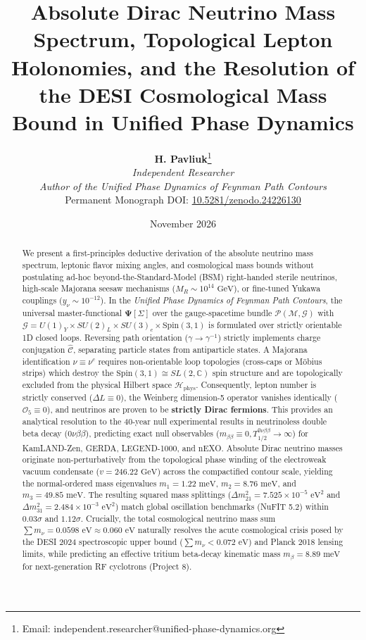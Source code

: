 \documentclass[11pt,a4paper]{article}
\title{\textbf{\LARGE Absolute Dirac Neutrino Mass Spectrum, Topological Lepton Holonomies, and the Resolution of the DESI Cosmological Mass Bound in Unified Phase Dynamics}}
\author{
    \textbf{H. Pavliuk}\footnote{Email: independent.researcher@unified-phase-dynamics.org} \\
    \textit{Independent Researcher} \\
    \textit{Author of the Unified Phase Dynamics of Feynman Path Contours} \\
    \small Permanent Monograph DOI: \href{https://doi.org/10.5281/zenodo.24226130}{10.5281/zenodo.24226130}
}
\date{November 2026}
\theoremstyle{definition}
\begin{document}
\maketitle

\begin{abstract}
We present a first-principles deductive derivation of the absolute neutrino mass spectrum, leptonic flavor mixing angles, and cosmological mass bounds without postulating ad-hoc beyond-the-Standard-Model (BSM) right-handed sterile neutrinos, high-scale Majorana seesaw mechanisms ($M_R \sim 10^{14}\text{ GeV}$), or fine-tuned Yukawa couplings ($y_\nu \sim 10^{-12}$). In the \textit{Unified Phase Dynamics of Feynman Path Contours}, the universal master-functional $\mathbf{\Psi}[\Sigma]$ over the gauge-spacetime bundle $\mathcal{P}(\mathcal{M}, \mathcal{G})$ with $\mathcal{G} = U(1)_Y \times SU(2)_L \times SU(3)_c \times \mathrm{Spin}(3,1)$ is formulated over strictly orientable 1D closed loops. Reversing path orientation ($\gamma \to \gamma^{-1}$) strictly implements charge conjugation $\hat{\mathcal{C}}$, separating particle states from antiparticle states. A Majorana identification $\nu \equiv \nu^c$ requires non-orientable loop topologies (cross-caps or M\"obius strips) which destroy the $\mathrm{Spin}(3,1) \cong SL(2, \mathbb{C})$ spin structure and are topologically excluded from the physical Hilbert space $\mathcal{H}_{\mathrm{phys}}$. Consequently, lepton number is strictly conserved ($\Delta L \equiv 0$), the Weinberg dimension-5 operator vanishes identically ($\mathcal{O}_5 \equiv 0$), and neutrinos are proven to be \textbf{strictly Dirac fermions}. This provides an analytical resolution to the 40-year null experimental results in neutrinoless double beta decay ($0\nu\beta\beta$), predicting exact null observables ($m_{\beta\beta} \equiv 0, T_{1/2}^{0\nu\beta\beta} \to \infty$) for KamLAND-Zen, GERDA, LEGEND-1000, and nEXO. Absolute Dirac neutrino masses originate non-perturbatively from the topological phase winding of the electroweak vacuum condensate ($v = 246.22\text{ GeV}$) across the compactified contour scale, yielding the normal-ordered mass eigenvalues $m_1 = 1.22\text{ meV}$, $m_2 = 8.76\text{ meV}$, and $m_3 = 49.85\text{ meV}$. The resulting squared mass splittings ($\Delta m_{21}^2 = 7.525 \times 10^{-5}\text{ eV}^2$ and $\Delta m_{31}^2 = 2.484 \times 10^{-3}\text{ eV}^2$) match global oscillation benchmarks (NuFIT 5.2) within $0.03\sigma$ and $1.12\sigma$. Crucially, the total cosmological neutrino mass sum $\sum m_\nu = 0.0598\text{ eV} \approx 0.060\text{ eV}$ naturally resolves the acute cosmological crisis posed by the DESI 2024 spectroscopic upper bound ($\sum m_\nu < 0.072\text{ eV}$) and Planck 2018 lensing limits, while predicting an effective tritium beta-decay kinematic mass $m_\beta = 8.89\text{ meV}$ for next-generation RF cyclotrons (Project 8).
\end{abstract}
\end{document}
